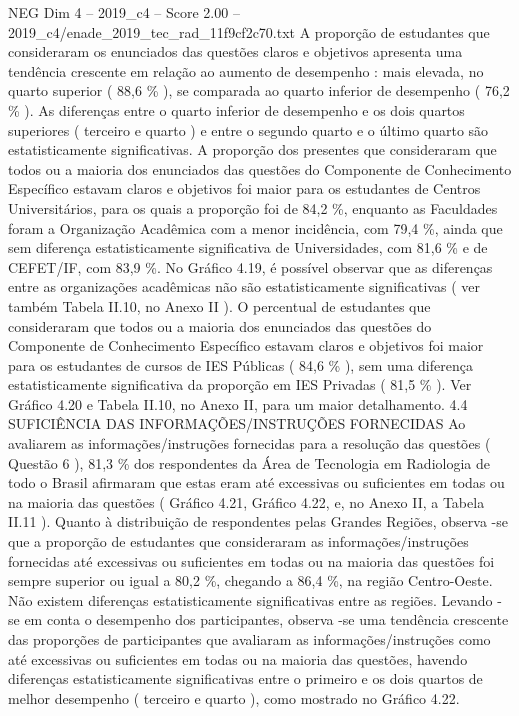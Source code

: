 \begin{textsample}{NEG Dim 4 – 2019\_c4 – Score 2.00 – 2019\_c4/enade\_2019\_tec\_rad\_11f9cf2c70.txt}
A proporção de estudantes que consideraram os enunciados das questões claros e objetivos apresenta uma tendência crescente em relação ao aumento de desempenho : mais elevada, no quarto superior ( 88,6 \% ), se comparada ao quarto inferior de desempenho ( 76,2 \% ).
As diferenças entre o quarto inferior de desempenho e os dois quartos superiores ( terceiro e quarto ) e entre o segundo quarto e o último quarto são estatisticamente significativas.
A proporção dos presentes que consideraram que todos ou a maioria dos enunciados das questões do Componente de Conhecimento Específico estavam claros e objetivos foi maior para os estudantes de Centros Universitários, para os quais a proporção foi de 84,2 \%, enquanto as Faculdades foram a Organização Acadêmica com a menor incidência, com 79,4 \%, ainda que sem diferença estatisticamente significativa de Universidades, com 81,6 \% e de CEFET/IF, com 83,9 \%.
No Gráfico 4.19, é possível observar que as diferenças entre as organizações acadêmicas não são estatisticamente significativas ( ver também Tabela II.10, no Anexo II ).
O percentual de estudantes que consideraram que todos ou a maioria dos enunciados das questões do Componente de Conhecimento Específico estavam claros e objetivos foi maior para os estudantes de cursos de IES Públicas ( 84,6 \% ), sem uma diferença estatisticamente significativa da proporção em IES Privadas ( 81,5 \% ).
Ver Gráfico 4.20 e Tabela II.10, no Anexo II, para um maior detalhamento. 4.4 SUFICIÊNCIA DAS INFORMAÇÕES/INSTRUÇÕES FORNECIDAS Ao avaliarem as informações/instruções fornecidas para a resolução das questões ( Questão 6 ), 81,3 \% dos respondentes da Área de Tecnologia em Radiologia de todo o Brasil afirmaram que estas eram até excessivas ou suficientes em todas ou na maioria das questões ( Gráfico 4.21, Gráfico 4.22, e, no Anexo II, a Tabela II.11 ).
Quanto à distribuição de respondentes pelas Grandes Regiões, observa -se que a proporção de estudantes que consideraram as informações/instruções fornecidas até excessivas ou suficientes em todas ou na maioria das questões foi sempre superior ou igual a 80,2 \%, chegando a 86,4 \%, na região Centro-Oeste.
Não existem diferenças estatisticamente significativas entre as regiões.
Levando -se em conta o desempenho dos participantes, observa -se uma tendência crescente das proporções de participantes que avaliaram as informações/instruções como até excessivas ou suficientes em todas ou na maioria das questões, havendo diferenças estatisticamente significativas entre o primeiro e os dois quartos de melhor desempenho ( terceiro e quarto ), como mostrado no Gráfico 4.22.

\end{textsample}
